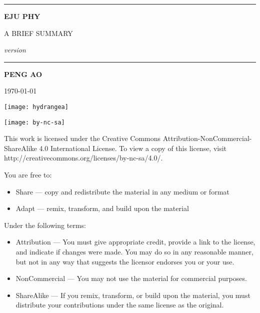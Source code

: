 
\begin{titlepage}
    \begin{center}
        \vspace{4cm}
        
        \rule{\textwidth}{1.2pt}
        
        \vspace{0.3cm}

        {\Huge \textbf{EJU PHY}}

        \vspace{0.3cm}

        {\LARGE A BRIEF SUMMARY}

        \vspace{0.3cm}

        {\Large \textit{version \version}}

        \rule{\textwidth}{1.2pt}

        \vspace{2cm}

        {\LARGE \textbf{PENG AO}}

        \vspace{0.5cm}
        {\Large \today}

        \vfill

        \texttt{[image: hydrangea]}
    \end{center}
\end{titlepage}


\clearpage
\begin{flushleft}
    \null

    \vfill
    \texttt{[image: by-nc-sa]}

    This work is licensed under the Creative Commons Attribution-NonCommercial-ShareAlike 4.0 International License. To view a copy of this license, visit http://creativecommons.org/licenses/by-nc-sa/4.0/.

    \vspace{1em}
    You are free to:
    \begin{itemize}
        \item Share — copy and redistribute the material in any medium or format
        \item Adapt — remix, transform, and build upon the material
    \end{itemize}

    Under the following terms:
    \begin{itemize}
        \item Attribution — You must give appropriate credit, provide a link to the license, and indicate if changes were made. You may do so in any reasonable manner, but not in any way that suggests the licensor endorses you or your use.
        \item NonCommercial — You may not use the material for commercial purposes.
        \item ShareAlike — If you remix, transform, or build upon the material, you must distribute your contributions under the same license as the original.
    \end{itemize}
\end{flushleft}

